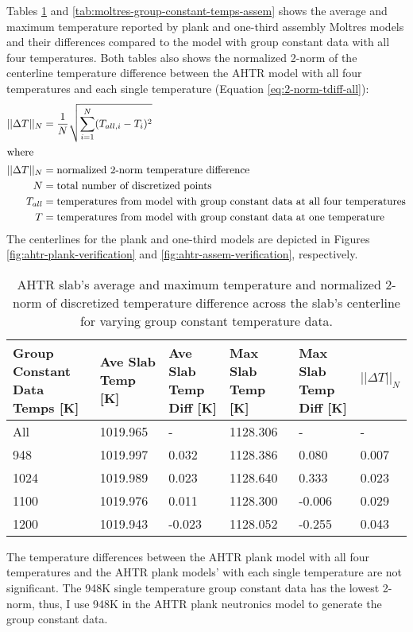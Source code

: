 Tables \ref{tab:moltres-group-constant-temps} and \ref{tab:moltres-group-constant-temps-assem}
shows the average and maximum temperature reported by plank and one-third assembly Moltres models 
and their differences compared to the model with group constant data with all four temperatures. 
Both tables also shows the normalized 2-norm of the centerline temperature difference between the 
AHTR model with all four temperatures and each single temperature (Equation \ref{eq:2-norm-tdiff-all}):
\begin{align}
    \label{eq:2-norm-tdiff-all}
    ||\Delta T||_N &= \frac{1}{N}\sqrt{\sum_{i=1}^N(T_{all, i} - T_{i})^2} \\
\intertext{where}
    ||\Delta T||_N &= \mbox{normalized 2-norm temperature difference} \nonumber \\
    N &= \mbox{total number of discretized points} \nonumber \\
    T_{all} &= \mbox{temperatures from model with group constant data at all four temperatures} \nonumber \\
    T &= \mbox{temperatures from model with group constant data at one temperature} \nonumber 
\end{align}
The centerlines for the plank and one-third models are depicted in Figures 
\ref{fig:ahtr-plank-verification} and \ref{fig:ahtr-assem-verification}, respectively. 

\begin{table}[htbp]
    \centering
    \onehalfspacing
    \caption{AHTR slab's average and maximum temperature and normalized 2-norm of discretized 
    temperature difference across the slab's centerline for varying group constant temperature data.}
	\label{tab:moltres-group-constant-temps}
    \scriptsize
    \begin{tabular}{p{2.5cm}p{2cm}p{2.4cm}p{2cm}p{2.4cm}p{2cm}}
    \hline 
    \textbf{Group Constant Data Temps [K]}& \textbf{Ave Slab Temp [K]}& 
    \textbf{Ave Slab Temp Diff [K]}& \textbf{Max Slab Temp [K]} & 
    \textbf{Max Slab Temp Diff [K]} & $||\Delta T||_N$ \\ 
    \hline 
    All  & 1019.965 &  -     & 1128.306 & -      & -    \\
    948 & 1019.997 &  0.032 & 1128.386 &  0.080 & 0.007\\
    1024 & 1019.989 &  0.023 & 1128.640 &  0.333 & 0.023 \\
    1100 & 1019.976 &  0.011 & 1128.300 & -0.006 & 0.029 \\
    1200 & 1019.943 & -0.023 & 1128.052 & -0.255 & 0.043 \\
    \hline
    \end{tabular}
\end{table}
The temperature differences between the AHTR plank model with all four temperatures 
and the AHTR plank models' with each single temperature are not significant. 
The 948K single temperature group constant data has the lowest 2-norm, thus, I 
use 948K in the \gls{AHTR} plank neutronics model to generate the group constant data.

